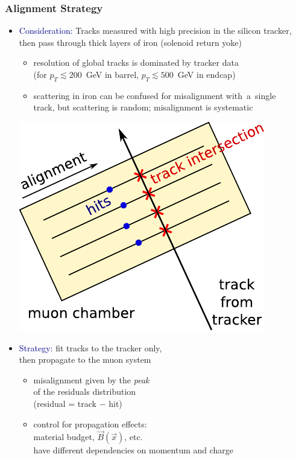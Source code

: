 \documentclass[compress]{beamer}
\begin{document}
\begin{frame}
\frametitle{Alignment Strategy}

\begin{itemize}\setlength{\itemsep}{0.35 cm}
\item \textcolor{darkblue}{Consideration:} Tracks measured with high precision in the silicon tracker, then
  pass through thick layers of iron (solenoid return yoke)
\begin{itemize}\setlength{\itemsep}{0.2 cm}
\item resolution of global tracks is dominated by tracker data \\ (for $p_T \lesssim 200$~GeV in barrel, $p_T \lesssim 500$~GeV in endcap)
\item scattering in iron can be confused for misalignment \mbox{with a single\hspace{-2 cm}} \\ track, but scattering is random; misalignment is systematic
\end{itemize}

\vspace{0.5 cm}
\hfill \includegraphics[height=3.3 cm]{hip_explanation.pdf}
\vspace{-3.5 cm}

\item \textcolor{darkblue}{Strategy:} fit tracks to the tracker only, \\ then propagate to the muon system
\begin{itemize}\setlength{\itemsep}{0.2 cm}
\item misalignment given by the {\it peak} \\ of the residuals distribution \\ (residual = track $-$ hit)
\item control for propagation effects: \\ material budget, $\vec{B}(\vec{x})$, etc. \\ have different dependencies on momentum and charge
\end{itemize}
\end{itemize}
\end{frame}
\end{document}
